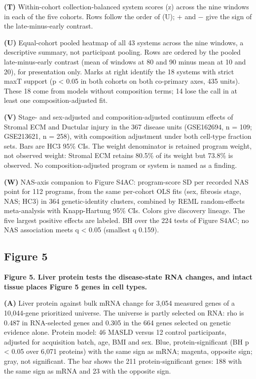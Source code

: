 \textbf{(T)} Within-cohort collection-balanced system scores (z) across the nine windows in each of the five cohorts. Rows follow the order of (U); + and − give the sign of the late-minus-early contrast.

\textbf{(U)} Equal-cohort pooled heatmap of all 43 systems across the nine windows, a descriptive summary, not participant pooling. Rows are ordered by the pooled late-minus-early contrast (mean of windows at 80 and 90 minus mean at 10 and 20), for presentation only. Marks at right identify the 18 systems with strict maxT support (p \textless{} 0.05 in both cohorts on both co-primary axes, 435 units). These 18 come from models without composition terms; 14 lose the call in at least one composition-adjusted fit.

\textbf{(V)} Stage- and sex-adjusted and composition-adjusted continuum effects of Stromal ECM and Ductular injury in the 367 disease units (GSE162694, n = 109; GSE213621, n = 258), with composition adjustment under both cell-type fraction sets. Bars are HC3 95\% CIs. The weight denominator is retained program weight, not observed weight: Stromal ECM retains 80.5\% of its weight but 73.8\% is observed. No composition-adjusted program or system is named as a finding.

\textbf{(W)} NAS-axis companion to Figure S4AC: program-score SD per recorded NAS point for 112 programs, from the same per-cohort OLS fits (sex, fibrosis stage, NAS; HC3) in 364 genetic-identity clusters, combined by REML random-effects meta-analysis with Knapp-Hartung 95\% CIs. Colors give discovery lineage. The five largest positive effects are labeled. BH over the 224 tests of Figure S4AC; no NAS association meets q \textless{} 0.05 (smallest q 0.159).

\subsection{Figure 5}\label{figure-5}

\textbf{Figure 5. Liver protein tests the disease-state RNA changes, and intact tissue places Figure 5 genes in cell types.}

\textbf{(A)} Liver protein against bulk mRNA change for 3,054 measured genes of a 10,044-gene prioritized universe. The universe is partly selected on RNA: rho is 0.487 in RNA-selected genes and 0.305 in the 664 genes selected on genetic evidence alone. Protein model: 46 MASLD versus 12 control participants, adjusted for acquisition batch, age, BMI and sex. Blue, protein-significant (BH p \textless{} 0.05 over 6,071 proteins) with the same sign as mRNA; magenta, opposite sign; gray, not significant. The bar shows the 211 protein-significant genes: 188 with the same sign as mRNA and 23 with the opposite sign.

